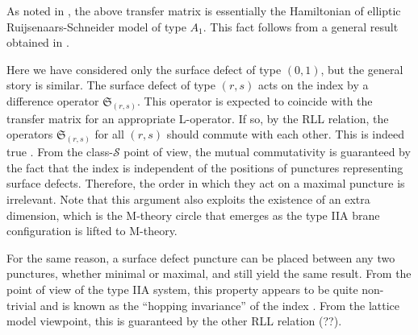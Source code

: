 As noted in \cite{Gaiotto:2012xa}, the above transfer matrix
is essentially the Hamiltonian of elliptic Ruijsenaars-Schneider model
\cite{MR851627,Ruijsenaars:1986pp} of type $A_{1}$. This fact
follows from a general result obtained in \cite{MR1463830}. 

Here we have considered only the surface defect of type $(0,1)$,
but the general story is similar. The surface defect of type $(r,s)$
acts on the index by a difference operator $\mathfrak{S}_{(r,s)}$.
This operator is expected to coincide with the transfer matrix for
an appropriate L-operator. If so, by the RLL relation, the operators
$\mathfrak{S}_{(r,s)}$ for all $(r,s)$ should commute with each
other. This is indeed true \cite{Gaiotto:2012xa}. From the class-$\mathcal{S}$
point of view, the mutual commutativity is guaranteed by the fact
that the index is independent of the positions of punctures representing
surface defects. Therefore, the order in which they act on a maximal
puncture is irrelevant. Note that this argument also exploits the
existence of an extra dimension, which is the M-theory circle that
emerges as the type IIA brane configuration is lifted to M-theory.

For the same reason, a surface defect puncture can be placed between
any two punctures, whether minimal or maximal, and still yield the
same result. From the point of view of the type IIA system, this property
appears to be quite non-trivial and is known as the ``hopping invariance''
of the index \cite{Gadde:2013dda}. From the lattice model viewpoint,
this is guaranteed by the other RLL relation (??). 












